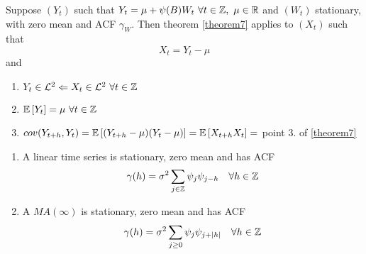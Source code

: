 \begin{remark}
    Suppose $(Y_t)$ such that $Y_t=\mu+\psi(B)W_t\ \forall t\in\mathbb{Z},\ \mu\in\mathbb{R}$ and $(W_t)$ stationary, with zero mean and ACF $\gamma_W$. Then theorem \ref{theorem7} applies to $(X_t)$ such that
    \[
        X_t=Y_t-\mu  
    \]
    and
    \begin{enumerate}
        \item $Y_t\in\el{2}\Leftarrow X_t\in\el{2}\ \forall t\in\Z$
        \item $\mathbb{E}\left[Y_t\right]=\mu\ \forall t\in\mathbb{Z}$
        \item $cov(Y_{t+h}, Y_t)=\mathbb{E}\left[(Y_{t+h}-\mu)(Y_t-\mu)\right]=\mathbb{E}\left[X_{t+h}X_t\right]=$ point 3. of \ref{theorem7}
    \end{enumerate}
\end{remark}

\begin{corollary}
    \begin{enumerate}
        \item A linear time series is stationary, zero mean and has ACF
        \[
            \gamma(h)=\sigma^2\sum_{j\in\Z}\psi_j\psi_{j-h}\ \ \ \forall h\in\Z  
        \]
        \item A $MA(\infty)$ is stationary, zero mean and has ACF
        \[
            \gamma(h)=\sigma^2\sum_{j\ge0}\psi_j\psi_{j+\abs{h}}\ \ \ \forall h\in\Z  
        \]
    \end{enumerate}
\end{corollary}

